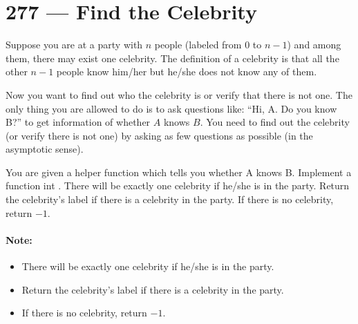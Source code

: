 \section{277 --- Find the Celebrity}
Suppose you are at a party with $n$ people (labeled from 0 to $n-1$) and among them, there may exist one celebrity. The definition of a celebrity is that all the other $n-1$ people know him/her but he/she does not know any of them.
\par
Now you want to find out who the celebrity is or verify that there is not one. The only thing you are allowed to do is to ask questions like: ``Hi, A. Do you know B?'' to get information of whether $A$ knows $B$. You need to find out the celebrity (or verify there is not one) by asking as few questions as possible (in the asymptotic sense).

You are given a helper function  which tells you whether A knows B. Implement a function int . There will be exactly one celebrity if he/she is in the party. Return the celebrity's label if there is a celebrity in the party. If there is no celebrity, return $-1$.

\paragraph{Note:} 
\begin{itemize}
\item There will be exactly one celebrity if he/she is in the party. 
\item Return the celebrity's label if there is a celebrity in the party.
\item If there is no celebrity, return $-1$.
\end{itemize}
